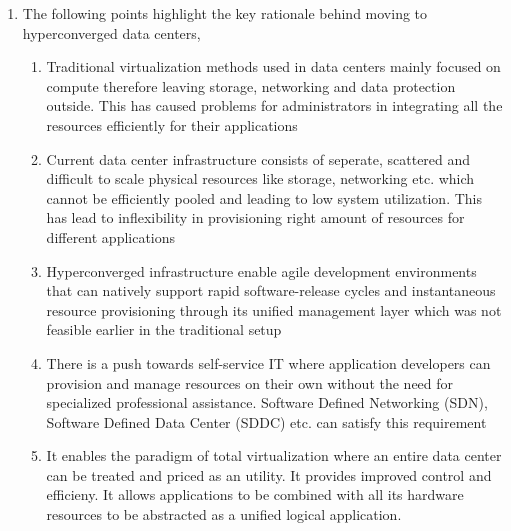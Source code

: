 \documentclass[11pt,a4paper,oneside]{article}
\begin{document}
\begin{enumerate}
                	
         
         \item	The following points highlight the key rationale behind moving to hyperconverged data centers,
                \begin{enumerate}
                	\item Traditional virtualization methods used in data centers mainly focused on compute therefore leaving storage, networking and data protection outside. This has caused problems for administrators in integrating all the resources efficiently for their applications
                	\item Current data center infrastructure consists of seperate, scattered and difficult to scale physical resources like storage, networking etc. which cannot be efficiently pooled and leading to low system utilization. This has lead to inflexibility in provisioning right amount of resources for different applications
                	\item Hyperconverged infrastructure enable agile development environments that can natively support rapid software-release cycles and instantaneous resource provisioning through its unified management layer which was not feasible earlier in the traditional setup
                	\item There is a push towards self-service IT where application developers can provision and manage resources on their own without the need for specialized professional assistance. Software Defined Networking (SDN), Software Defined Data Center (SDDC) etc. can satisfy this requirement
                	\item It enables the paradigm of total virtualization where an entire data center can be treated and priced as an utility. It provides improved control and efficieny. It allows applications to be combined with all its hardware resources to be abstracted as a unified logical application.
                \end{enumerate}
		 			
				
	\end{enumerate}
    
\end{document}
